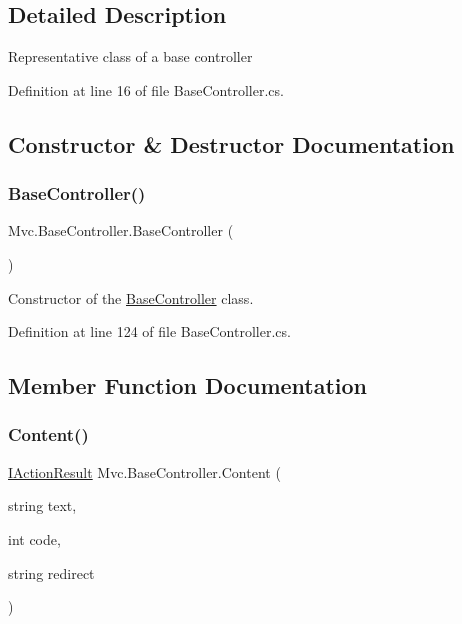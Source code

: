 \subsection{Detailed Description}
Representative class of a base controller 



Definition at line 16 of file Base\+Controller.\+cs.



\subsection{Constructor \& Destructor Documentation}
\mbox{\label{class_mvc_1_1_base_controller_a5d30ca8bf9e277187b8212fb6b8a8428}} 
\subsubsection{\texorpdfstring{Base\+Controller()}{BaseController()}}
{\footnotesize\ttfamily Mvc.\+Base\+Controller.\+Base\+Controller (\begin{DoxyParamCaption}{ }\end{DoxyParamCaption})}



Constructor of the \hyperlink{class_mvc_1_1_base_controller}{Base\+Controller} class. 



Definition at line 124 of file Base\+Controller.\+cs.



\subsection{Member Function Documentation}
\mbox{\label{class_mvc_1_1_base_controller_a391c25d6786a328c92aa81a786786a21}} 
\subsubsection{\texorpdfstring{Content()}{Content()}}
{\footnotesize\ttfamily \hyperlink{interface_mvc_1_1_i_action_result}{I\+Action\+Result} Mvc.\+Base\+Controller.\+Content (\begin{DoxyParamCaption}\item[{string}]{text,  }\item[{int}]{code,  }\item[{string}]{redirect }\end{DoxyParamCaption})}



